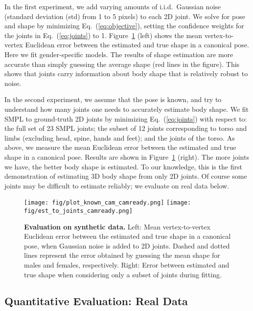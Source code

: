 \documentclass[runningheads]{llncs}
\begin{document}
In the first experiment, we add varying amounts of i.i.d.~Gaussian
noise (standard deviation (std) from 1 to 5 pixels)
to each 2D joint. We solve for pose and shape by minimizing Eq.~(\ref{eq:objective}), setting the confidence weights for the joints in Eq.~(\ref{eq:joints}) to 1.
Figure~\ref{fig:noise} (left) shows the mean vertex-to-vertex Euclidean error between the estimated and true shape in a canonical pose.
Here we fit gender-specific models. The results of shape estimation are more accurate than simply guessing the average shape (red lines in the figure).
This shows that joints carry information about body shape that is relatively robust to noise.

In the second experiment, we assume that the pose is known, and try to
understand how many joints one needs to accurately
estimate body shape.
We fit SMPL to ground-truth 2D joints by minimizing
Eq.~(\ref{eq:joints}) with respect to: the full set of 23 SMPL joints;
the subset of 12 joints corresponding to torso and limbs (excluding head, spine, hands and feet); and the  joints of the torso.
As above, we measure the mean Euclidean error between the estimated and true shape in a canonical pose.
Results are shown in Figure~\ref{fig:noise} (right).
The more joints we have, the better body shape is estimated.
To our knowledge, this is the first demonstration of estimating 3D
body shape from only 2D joints.
Of course some joints may be difficult to estimate reliably;
we evaluate on real data below.


\begin{figure}[t]
  \centering
{}
  \texttt{[image: fig/plot\_known\_cam\_camready.png]}
\endminipage\hfill
{}
\texttt{[image: fig/est\_to\_joints\_camready.png]}
\endminipage\hfill
\caption{{\bf Evaluation on synthetic data.} Left: Mean vertex-to-vertex
  Euclidean error between the estimated and true shape in a canonical pose, when
  Gaussian noise is added to 2D joints. Dashed and dotted lines represent the
  error obtained by guessing the mean shape for males and females,
  respectively. Right: Error between estimated and true shape when
  considering only a subset of joints during fitting.}\label{fig:noise}
\end{figure}

\subsection{Quantitative Evaluation: Real Data}
\label{subsec:quantitative}
\end{document}
